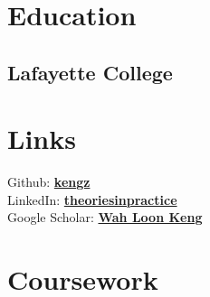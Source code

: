 \documentclass{deedy-resume-openfont}
\begin{document}
%
%
\lastupdated

%
%

%
%

\begin{minipage}[t]{0.33\textwidth}


\section{Education}

\subsection{Lafayette College}
\sectionsep



\section{Links}
Github: \href{https://github.com/kengz}{\bf kengz} \\
LinkedIn:  \href{https://www.linkedin.com/in/theoriesinpractice}{\bf theoriesinpractice} \\
Google Scholar: \href{https://scholar.google.com/citations?user=J0aM_cEAAAAJ&hl=en}{\bf Wah Loon Keng}
\sectionsep


\section{Coursework}

\end{minipage}
\end{document}
